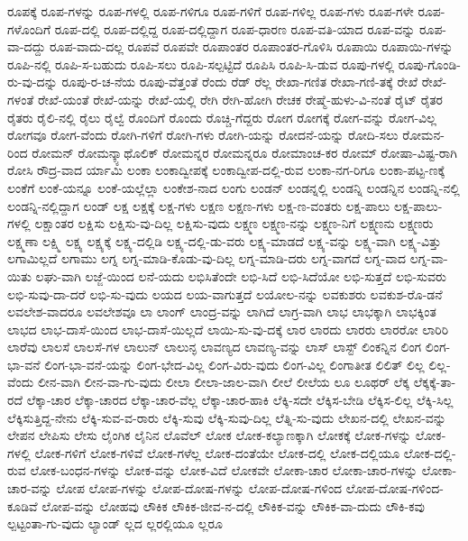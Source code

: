 {ರೂಪಕ್ಕೆ
ರೂಪ-ಗಳನ್ನು
ರೂಪ-ಗಳಲ್ಲಿ
ರೂಪ-ಗಳಿಗೂ
ರೂಪ-ಗಳಿಗೆ
ರೂಪ-ಗಳಿಲ್ಲ
ರೂಪ-ಗಳು
ರೂಪ-ಗಳೇ
ರೂಪ-ಗಳೊಂದಿಗೆ
ರೂಪ-ದಲ್ಲಿ
ರೂಪ-ದಲ್ಲಿದ್ದ
ರೂಪ-ದಲ್ಲಿದ್ದಾಗ
ರೂಪ-ಧಾರಣ
ರೂಪ-ವತಿ-ಯಾದ
ರೂಪ-ವನ್ನು
ರೂಪ-ವಾ-ದದ್ದು
ರೂಪ-ವಾದು-ದಲ್ಲ
ರೂಪವೆ
ರೂಪವೇ
ರೂಪಾಂತರ
ರೂಪಾಂತರ-ಗೊಳಿಸಿ
ರೂಪಾಯಿ
ರೂಪಾಯಿ-ಗಳನ್ನು
ರೂಪಿ-ನಲ್ಲಿ
ರೂಪಿ-ಸ-ಬಹುದು
ರೂಪಿ-ಸಲು
ರೂಪಿ-ಸಲ್ಪಟ್ಟಿದೆ
ರೂಪಿಸಿ
ರೂಪಿ-ಸಿ-ಡುವ
ರೂಪು-ಗಳಲ್ಲಿ
ರೂಪು-ಗೊಂಡಿ-ರು-ವು-ದನ್ನು
ರೂಪು-ರ-ಚ-ನೆಯ
ರೂಪು-ವೆತ್ತಂತೆ
ರೆಂದು
ರೆಡ್
ರೆಲ್ಲ
ರೇಖಾ-ಗಣಿತ
ರೇಖಾ-ಗಣಿ-ತಕ್ಕೆ
ರೇಖೆ
ರೇಖೆ-ಗಳಂತೆ
ರೇಖೆ-ಯಂತೆ
ರೇಖೆ-ಯನ್ನು
ರೇಖೆ-ಯಲ್ಲಿ
ರೇಗಿ
ರೇಗಿ-ಹೋಗಿ
ರೇಚಕ
ರೇಷ್ಮೆ-ಹುಳು-ವಿ-ನಂತೆ
ರೈಟ್
ರೈತರ
ರೈತರು
ರೈಲಿ-ನಲ್ಲಿ
ರೈಲು
ರೈಲ್ವೆ
ರೊಂದಿಗೆ
ರೊಂದು
ರೊಚ್ಚಿ-ಗೆದ್ದರು
ರೋಗ
ರೋಗಕ್ಕೆ
ರೋಗ-ವನ್ನು
ರೋಗ-ವಿಲ್ಲ
ರೋಗವೂ
ರೋಗ-ವೆಂದು
ರೋಗಿ-ಗಳಿಗೆ
ರೋಗಿ-ಗಳು
ರೋಗಿ-ಯನ್ನು
ರೋದನೆ-ಯನ್ನು
ರೋದಿ-ಸಲು
ರೋಮನ-ರಿಂದ
ರೋಮನ್
ರೋಮನ್ಕ್ಯಾಥೊಲಿಕ್
ರೋಮನ್ನರ
ರೋಮನ್ನರೂ
ರೋಮಾಂಚ-ಕರ
ರೋಮ್
ರೋಷಾ-ವಿಷ್ಟ-ರಾಗಿ
ರೋಸಿ
ರೌದ್ರ-ವಾದ
ರ್ಯಾಮಿ
ಲಂಕಾ
ಲಂಕಾದ್ವೀಪಕ್ಕೆ
ಲಂಕಾದ್ವೀಪ-ದಲ್ಲಿ-ರುವ
ಲಂಕಾ-ನಗ-ರಿಗೂ
ಲಂಕಾ-ಪಟ್ಟ-ಣಕ್ಕೆ
ಲಂಕೆಗೆ
ಲಂಕೆ-ಯನ್ನೂ
ಲಂಕೆ-ಯಲ್ಲೆಲ್ಲಾ
ಲಂಕೇಶ-ನಾದ
ಲಂಗು
ಲಂಡನ್
ಲಂಡನ್ನಲ್ಲಿ
ಲಂಡನ್ನಿ
ಲಂಡನ್ನಿನ
ಲಂಡನ್ನಿ-ನಲ್ಲಿ
ಲಂಡನ್ನಿ-ನಲ್ಲಿದ್ದಾಗ
ಲಂಡ್
ಲಕ್ಷ
ಲಕ್ಷಕ್ಕೆ
ಲಕ್ಷ-ಗಳು
ಲಕ್ಷಣ
ಲಕ್ಷಣ-ಗಳು
ಲಕ್ಷ-ಣ-ವಂತರು
ಲಕ್ಷ-ಪಾಲು
ಲಕ್ಷ-ಪಾಲು-ಗಳಲ್ಲಿ
ಲಕ್ಷಾಂತರ
ಲಕ್ಷಿಸು
ಲಕ್ಷಿಸು-ವು-ದಿಲ್ಲ
ಲಕ್ಷಿಸು-ವುದು
ಲಕ್ಷ್ಮಣ
ಲಕ್ಷ್ಮಣ-ನನ್ನು
ಲಕ್ಷ್ಮಣ-ನಿಗೆ
ಲಕ್ಷ್ಮಣನು
ಲಕ್ಷ್ಮಣರು
ಲಕ್ಷ್ಮಣಾ
ಲಕ್ಷ್ಮಿ
ಲಕ್ಷ್ಯ
ಲಕ್ಷ್ಯಕ್ಕೆ
ಲಕ್ಷ್ಯ-ದಲ್ಲಿಡಿ
ಲಕ್ಷ್ಯ-ದಲ್ಲಿ-ಡು-ವರು
ಲಕ್ಷ್ಯ-ಮಾಡದೆ
ಲಕ್ಷ್ಯ-ವನ್ನು
ಲಕ್ಷ್ಯ-ವಾಗಿ
ಲಕ್ಷ್ಯ-ವಿತ್ತು
ಲಗಾಮಿಲ್ಲದೆ
ಲಗಾಮು
ಲಗ್ನ
ಲಗ್ನ-ಮಾಡಿ-ಕೊಡು-ವು-ದಿಲ್ಲ
ಲಗ್ನ-ಮಾಡಿ-ದರು
ಲಗ್ನ-ವಾಗದೆ
ಲಗ್ನ-ವಾದ
ಲಗ್ನ-ವಾ-ಯಿತು
ಲಘು-ವಾಗಿ
ಲಜ್ಜೆ-ಯಿಂದ
ಲನೆ-ಯದು
ಲಭಿಸಿತೆಂದೇ
ಲಭಿ-ಸಿದೆ
ಲಭಿ-ಸಿದೆಯೋ
ಲಭಿ-ಸುತ್ತದೆ
ಲಭಿ-ಸುವರು
ಲಭಿ-ಸುವು-ದಾ-ದರೆ
ಲಭಿ-ಸು-ವುದು
ಲಯದ
ಲಯ-ವಾಗುತ್ತದೆ
ಲಯೋಲ-ನನ್ನು
ಲವಕುಶರು
ಲವಕುಶ-ರೊ-ಡನೆ
ಲವಲೇಶ-ವಾದರೂ
ಲವಲೇಶವೂ
ಲಾ
ಲಾಂಗ್
ಲಾಂದ್ರ-ವನ್ನು
ಲಾಗಿದೆ
ಲಾಗ್ರ-ವಾಗಿ
ಲಾಭ
ಲಾಭಕ್ಕಾಗಿ
ಲಾಭಕ್ಕಿಂತ
ಲಾಭದ
ಲಾಭ-ದಾಸೆ-ಯಿಂದ
ಲಾಭ-ದಾಸೆ-ಯಿಲ್ಲದೆ
ಲಾಯಿ-ಸು-ವು-ದಕ್ಕೆ
ಲಾರ
ಲಾರದು
ಲಾರರು
ಲಾರರೋ
ಲಾರಿರಿ
ಲಾರೆವು
ಲಾಲಸೆ
ಲಾಲಸೆ-ಗಳ
ಲಾಲುನ್
ಲಾಲುನ್ಳ
ಲಾವಣ್ಯದ
ಲಾವಣ್ಯ-ವನ್ನು
ಲಾಸ್
ಲಾಸ್ಟ್
ಲಿಂಕನ್ನಿನ
ಲಿಂಗ
ಲಿಂಗ-ಭಾ-ವನೆ
ಲಿಂಗ-ಭಾ-ವನೆ-ಯನ್ನು
ಲಿಂಗ-ಭೇದ-ವಿಲ್ಲ
ಲಿಂಗ-ವಿರು-ವುದು
ಲಿಂಗ-ವಿಲ್ಲ
ಲಿಂಗಾತೀತ
ಲಿಲಿತ್
ಲಿಲ್ಲ
ಲಿಲ್ಲ-ವೆಂದು
ಲೀನ-ವಾಗಿ
ಲೀನ-ವಾ-ಗು-ವುದು
ಲೀಲಾ
ಲೀಲಾ-ಜಾಲ-ವಾಗಿ
ಲೀಲೆ
ಲೀಲೆಯ
ಲೂ
ಲೂಥರ್
ಲೆಕ್ಕ
ಲೆಕ್ಕಕ್ಕೆ-ತಾ-ರದೆ
ಲೆಕ್ಕಾ-ಚಾರ
ಲೆಕ್ಕಾ-ಚಾರದ
ಲೆಕ್ಕಾ-ಚಾರ-ವೆಲ್ಲ
ಲೆಕ್ಕಾ-ಚಾರ-ಹಾಕಿ
ಲೆಕ್ಕಿ-ಸದೇ
ಲೆಕ್ಕಿಸ-ಬೇಡಿ
ಲೆಕ್ಕಿಸ-ಲಿಲ್ಲ
ಲೆಕ್ಕಿ-ಸಿಲ್ಲ
ಲೆಕ್ಕಿಸುತ್ತಿದ್ದ-ನೇನು
ಲೆಕ್ಕಿ-ಸುವ-ವ-ರಾರು
ಲೆಕ್ಕಿ-ಸುವು
ಲೆಕ್ಕಿ-ಸುವು-ದಿಲ್ಲ
ಲೆತ್ನಿ-ಸು-ವುದು
ಲೇಖನ-ದಲ್ಲಿ
ಲೇಖನ-ವನ್ನು
ಲೇಪನ
ಲೇಪಿಸು
ಲೇಸು
ಲೈಂಗಿಕ
ಲೈನಿನ
ಲೊವೆಲ್
ಲೋಕ
ಲೋಕ-ಕಲ್ಯಾಣಕ್ಕಾಗಿ
ಲೋಕಕ್ಕೆ
ಲೋಕ-ಗಳನ್ನು
ಲೋಕ-ಗಳಲ್ಲಿ
ಲೋಕ-ಗಳಿಗೆ
ಲೋಕ-ಗಳಿವೆ
ಲೋಕ-ಗಳೆಲ್ಲ
ಲೋಕ-ದಂತೆಯೇ
ಲೋಕ-ದಲ್ಲಿ
ಲೋಕ-ದಲ್ಲಿಯೂ
ಲೋಕ-ದಲ್ಲಿ-ರುವ
ಲೋಕ-ಬಂಧನ-ಗಳನ್ನು
ಲೋಕ-ವನ್ನು
ಲೋಕ-ವಿದೆ
ಲೋಕವೇ
ಲೋಕಾ-ಚಾರ
ಲೋಕಾ-ಚಾರ-ಗಳನ್ನು
ಲೋಕಾ-ಚಾರ-ವನ್ನು
ಲೋಪ
ಲೋಪ-ಗಳನ್ನು
ಲೋಪ-ದೋಷ-ಗಳನ್ನು
ಲೋಪ-ದೋಷ-ಗಳಿಂದ
ಲೋಪ-ದೋಷ-ಗಳಿಂದ-ಕೂಡಿವೆ
ಲೋಪ-ವನ್ನು
ಲೋಹವು
ಲೌಕಿಕ
ಲೌಕಿಕ-ಜೀವ-ನ-ದಲ್ಲಿ
ಲೌಕಿಕ-ವನ್ನು
ಲೌಕಿಕ-ವಾ-ದುದು
ಲೌಕಿ-ಕವು
ಲ್ಪಟ್ಟಂತಾ-ಗು-ವುದು
ಲ್ಯಾಂಡ್
ಲ್ಲದ
ಲ್ಲರಲ್ಲಿಯೂ
ಲ್ಲರೂ
}
